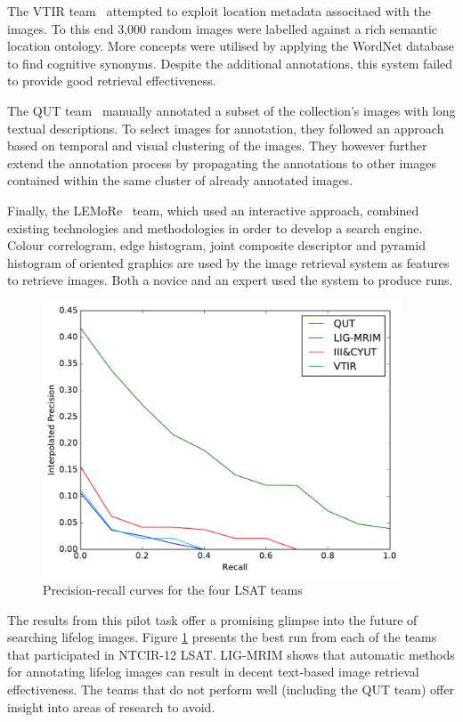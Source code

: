 The VTIR team~\cite{xia2016vtir} attempted to exploit location metadata associtaed with the images. To this end 3,000 random images were labelled against a rich semantic location ontology. More concepts were utilised by applying the WordNet database to find cognitive synonyms. Despite the additional annotations, this system failed to provide good retrieval effectiveness.

The QUT team~\cite{scells2016qut} manually annotated a subset of the collection's images with long textual descriptions. To select images for annotation, they followed an approach based on temporal and visual clustering of the images. They however further extend the annotation process by propagating the annotations to other images contained within the same cluster of already annotated images.

Finally, the LEMoRe~\cite{de40lemore} team, which used an interactive approach, combined existing technologies and methodologies in order to develop a search engine. Colour correlogram, edge histogram, joint composite descriptor and pyramid histogram of oriented graphics are used by the image retrieval system as features to retrieve images. Both a novice and an expert used the system to produce runs.

\begin{figure}[t]
    \centering
    \includegraphics[width=0.95\textwidth]{graphs/ntcir-pr-curve}
    \caption{Precision-recall curves for the four LSAT teams}
    \label{fig:ntcir-results}
\end{figure}

The results from this pilot task offer a promising glimpse into the future of searching lifelog images. Figure \ref{fig:ntcir-results} presents the best run from each of the teams that participated in NTCIR-12 LSAT. LIG-MRIM shows that automatic methods for annotating lifelog images can result in decent text-based image retrieval effectiveness. The teams that do not perform well (including the QUT team) offer insight into areas of research to avoid. 

